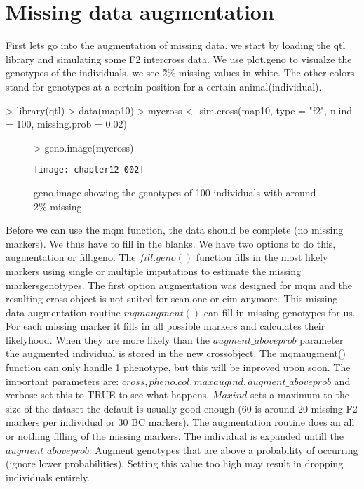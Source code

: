 \documentclass[11pt]{article}
\begin{document}
\section{Missing data augmentation}
First lets go into the augmentation of missing data. we start by loading the qtl library and simulating some F2 intercross data. We use plot.geno to visualze the genotypes of the individuals. we see \~2\% missing values in white. The other colors stand for genotypes at a certain position for a certain animal(individual).
\begin{Schunk}
\begin{Sinput}
> library(qtl)
> data(map10)
> mycross <- sim.cross(map10, type = "f2", n.ind = 100, missing.prob = 0.02)
\end{Sinput}
\end{Schunk}
\begin{figure}[ht]
\begin{Schunk}
\begin{Sinput}
> geno.image(mycross)
\end{Sinput}
\end{Schunk}
\texttt{[image: chapter12-002]}
\caption{geno.image showing the genotypes of 100 individuals with around 2\% missing}
\end{figure}
Before we can use the mqm function, the data should be complete (no missing markers). We thus have to fill in the blanks. We have two options to do this, augmentation or fill.geno. The $fill.geno()$ function fills in the most likely markers using single or multiple imputations
to estimate the missing markersgenotypes. The first option augmentation was designed for mqm and the resulting cross object is not suited for scan.one or cim anymore. This missing data augmentation routine $mqmaugment()$ can fill in missing genotypes for us. For each missing marker it fills in all possible markers and calculates their likelyhood. When they are more likely than the $augment\_aboveprob$ parameter the augmented individual is stored in the new crossobject. The mqmaugment() function can only handle 1 phenotype, but this will be inproved upon soon. The important parameters are:
$cross, pheno.col, maxaugind, augment\_aboveprob$ and verbose set this to TRUE to see what happens. $Maxind$ sets a maximum to the size of the dataset the default is usually good enough (60 is around 20 missing F2 markers per individual or 30 BC markers). The augmentation routine does an all or nothing filling of the missing markers. The individual is expanded untill the $augment\_aboveprob$: Augment genotypes that are above a probability of occurring (ignore lower probabilities). Setting this value too high may result in dropping individuals entirely.
\end{document}
